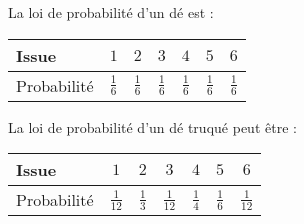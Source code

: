 \documentclass[
	classe=$2^{de}$
]{coursclass}
\begin{document}
\begin{exemple}
	\begin{multicols}{2}
		La loi de probabilité d'un dé est :
		\begin{center}
			\begin{tabular}{|l|c|c|c|c|c|c|}
				\hline
				Issue       & $1$           & $2$           & $3$           & $4$           & $5$           & $6$           \\ \hline
				Probabilité & $\frac{1}{6}$ & $\frac{1}{6}$ & $\frac{1}{6}$ & $\frac{1}{6}$ & $\frac{1}{6}$ & $\frac{1}{6}$ \\ \hline
			\end{tabular}
		\end{center}

		\columnbreak

		La loi de probabilité d'un dé truqué peut être :
		\begin{center}
			\begin{tabular}{|l|c|c|c|c|c|c|}
				\hline
				Issue       & $1$           & $2$           & $3$           & $4$           & $5$           & $6$           \\ \hline
				Probabilité & $\frac{1}{12}$ & $\frac{1}{3}$ & $\frac{1}{12}$ & $\frac{1}{4}$ & $\frac{1}{6}$ & $\frac{1}{12}$ \\ \hline
			\end{tabular}
		\end{center}
	\end{multicols}
\end{exemple}
\end{document}
